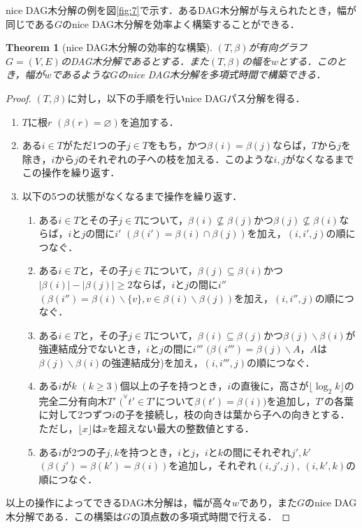 \documentclass[master]{kuisthesis}		%
\theoremstyle{plain}
\newtheorem{theorem}{Theorem}
\theoremstyle{definition}
\begin{document}
nice DAG木分解の例を図\ref{fig:7}で示す．あるDAG木分解が与えられたとき，幅が同じである$G$のnice DAG木分解を効率よく構築することができる．

\begin{theorem}[nice DAG木分解の効率的な構築]
    $(T, \beta)$が有向グラフ$G=(V, E)$のDAG木分解であるとする．また$(T, \beta)$の幅を$w$とする．このとき，幅が$w$であるような$G$のnice DAG木分解を多項式時間で構築できる．
\end{theorem}

\begin{proof}
    $(T, \beta)$に対し，以下の手順を行いnice DAGパス分解を得る．

    \begin{enumerate}
        \item $T$に根$r$ $(\beta(r) = \varnothing)$を追加する．
        \item ある$i \in T$がただ1つの子$j \in T$をもち，かつ$\beta(i) = \beta(j)$ならば，$T$から$j$を除き，$i$から$j$のそれぞれの子への枝を加える．このような$i, j$がなくなるまでこの操作を繰り返す．
        \item 以下の5つの状態がなくなるまで操作を繰り返す．
        \begin{enumerate}
            \item ある$i \in T$とその子$j \in T$について，$\beta(i) \nsubseteq \beta(j)$かつ$\beta(j) \nsubseteq \beta(i)$ならば，$i$と$j$の間に$i'$ $(\beta(i') = \beta(i) \cap \beta(j))$を加え，$(i, i', j)$の順につなぐ．
            \item ある$i \in T$と，その子$j \in T$について，$\beta(j) \subseteq \beta(i)$かつ$|\beta(i)| - |\beta(j)| \geq 2$ならば，$i$と$j$の間に$i''$ $(\beta(i'') = \beta(i) \backslash \{v\}, v \in \beta(i) \backslash \beta(j))$を加え，$(i, i'', j)$の順につなぐ．
            \item ある$i \in T$と，その子$j \in T$について，$\beta(i) \subseteq \beta(j)$かつ$\beta(j) \backslash \beta(i)$が強連結成分でないとき，$i$と$j$の間に$i'''$ $(\beta(i''') = \beta(j) \backslash A$，$A$は$\beta(j) \backslash \beta(i)$の強連結成分)を加え，$(i, i''', j)$の順につなぐ．
            \item ある$i$が$k$ $(k \geq 3)$個以上の子を持つとき，$i$の直後に，高さが$\lfloor \log_{2} k \rfloor$の完全二分有向木$T'$ $(^{\forall}t' \in T'$について$\beta(t') = \beta(i))$を追加し，$T'$の各葉に対して2つずつ$i$の子を接続し，枝の向きは葉から子への向きとする．ただし，$\lfloor x \rfloor$は$x$を超えない最大の整数値とする．
            \item ある$i$が2つの子$j, k$を持つとき，$i$と$j$，$i$と$k$の間にそれぞれ$j', k'$ $(\beta(j') = \beta(k') = \beta(i))$を追加し，それぞれ$(i, j', j),\ (i, k', k)$の順につなぐ．
        \end{enumerate}
    \end{enumerate}

    以上の操作によってできるDAG木分解は，幅が高々$w$であり，また$G$のnice DAG木分解である．この構築は$G$の頂点数の多項式時間で行える．
\end{proof}
\end{document}
